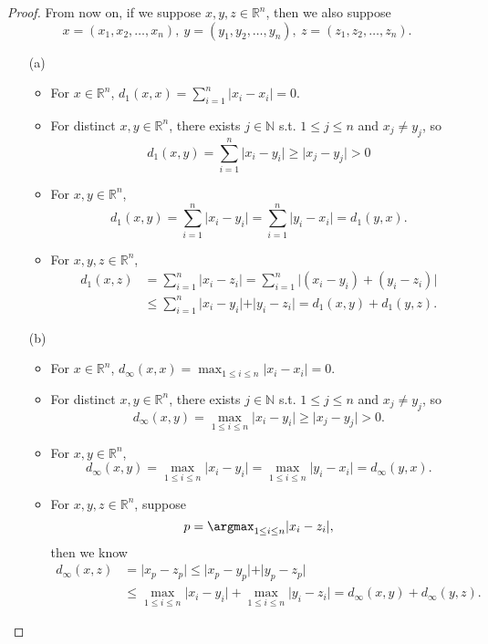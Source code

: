 \begin{proof}
  From now on, if we suppose \(x,y,z \in \mathbb{R} ^n\), then we also suppose 
  \[
    x = (x_1, x_2, \dots , x_n), \ y = (y_1, y_2, \dots , y_n), \ z = (z_1, z_2, \dots , z_n).
  \]   
  \begin{itemize}
    \item [(a)] 
    \begin{itemize}[\(\bullet\)]
      \item For \(x \in \mathbb{R} ^n\), \(d_1(x,x)=\sum_{i=1}^n \vert x_i - x_i \vert = 0 \). 
      \item For distinct \(x, y \in \mathbb{R} ^n\), there exists \(j \in \mathbb{N} \) s.t. \(1 \le j \le n\) and \(x_j \neq y_j\), so
      \[
        d_1(x, y) = \sum_{i=1}^n \vert x_i - y_i \vert \ge \vert x_j - y_j \vert > 0 
      \]
      \item For \(x, y \in \mathbb{R} ^n\), 
      \[
        d_1(x,y) = \sum_{i=1}^n \vert x_i - y_i \vert = \sum_{i=1}^n \vert y_i - x_i \vert = d_1(y, x).    
      \]
      \item For \(x, y, z \in \mathbb{R} ^n\), 
      \begin{align*}
        d_1(x, z) &= \sum_{i=1}^n \vert x_i - z_i \vert = \sum_{i=1}^n \vert (x_i - y_i) + (y_i - z_i) \vert \\ 
        &\le \sum_{i=1}^n \vert x_i - y_i \vert + \vert y_i - z_i \vert = d_1(x,y) + d_1(y,z).       
      \end{align*}
    \end{itemize}
    \item [(b)] \begin{itemize}[\(\bullet\) ]
      \item For \(x \in \mathbb{R} ^n\), \(d_\infty (x,x) = \max _{1 \le i \le n} \vert x_i - x_i \vert = 0 \).
      \item For distinct \(x, y \in \mathbb{R} ^n\), there exists \(j \in \mathbb{N} \) s.t. \(1 \le j \le n\) and \(x_j \neq y_j\), so 
      \[
        d_\infty (x, y) = \max _{1 \le i \le n} \vert x_i - y_i \vert \ge \vert x_j - y_j \vert > 0.  
      \]
      \item For \(x, y \in \mathbb{R} ^n\), 
      \[
        d_\infty (x,y) = \max _{1 \le i \le n} \vert x_i - y_i \vert = \max _{1 \le i \le n} \vert y_i - x_i \vert = d_\infty (y, x).  
      \]
      \item For \(x, y, z \in \mathbb{R} ^n\), suppose 
      \[
        p = \argmax_{1 \le i \le n} \vert x_i - z_i \vert, 
      \] then we know 
     \begin{align*}
        d_\infty (x, z) &= \vert x_p - z_p \vert \le \vert x_p - y_p \vert + \vert y_p - z_p \vert \\ 
        &\le \max _{1 \le i \le n} \vert x_i - y_i \vert + \max _{1 \le i \le n} \vert y_i - z_i \vert = d_\infty (x,y) + d_\infty (y,z). 
     \end{align*}
    \end{itemize}
  \end{itemize}
\end{proof}

